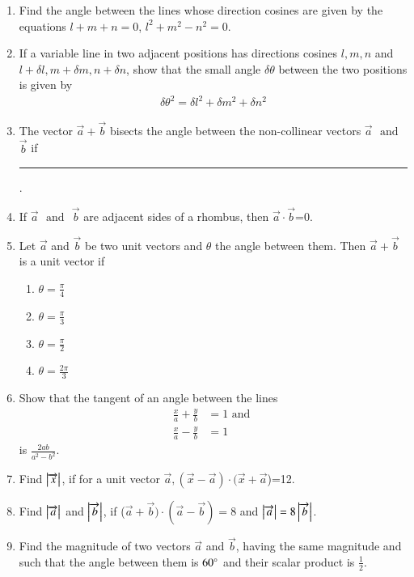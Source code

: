 \begin{enumerate}[label=\thesubsection.\arabic*,ref=\thesubsection.\theenumi]
\item Find the angle between the lines whose direction cosines are given by the equations $l+m+n=0$, $l^2+m^2-n^2=0$.
\item If a variable line in two adjacent positions has directions cosines $l, m, n$ and $l+\delta l, m+\delta m, n+\delta n$, show that the small angle $\delta\theta$ between the two positions is given by 
\begin{align}
	\delta\theta^2=\delta l^2+\delta m^2+\delta n^2
\end{align}
\item The vector $\vec{a}+\vec{b}$ bisects the angle between the non-collinear vectors $\vec{a}$ $\text{ and }$ $\vec{b}$ if \rule{1cm}{0.15mm}.
\item If $\vec{a}$ $\text{ and }$ $\vec{b}$ are adjacent sides of a rhombus, then $\vec{a}\cdot \vec{b}$=0.
\item Let $\vec{a}$ and $\vec{b}$ be two unit vectors and $\theta$ the angle between them. Then $\vec{a}+\vec{b}$ is a unit vector if
	\begin{enumerate}
			\itemsep2pt
		\item $\theta = \frac{\pi}{4}$
		\item $\theta = \frac{\pi}{3}$
		\item $\theta = \frac{\pi}{2}$
		\item $\theta = \frac{2\pi}{3}$
			\end{enumerate}
\solution

\item Show that the tangent of an angle between the lines 
\begin{align}
	\frac{x}{a}+\frac{y}{b}&=1 \text{ and }
	\\
	\frac{x}{a}-\frac{y}{b}&=1 
\end{align}
is $\frac{2ab}{a^2-b^2}$.
\item Find $\left\vert\overrightarrow {x}\right\vert$, if for a unit vector $\overrightarrow {a}, (\overrightarrow {x}-\overrightarrow {a})\cdot (\overrightarrow {x}+\overrightarrow {a}$)=12.
	\\
\solution 
		
\item Find $\left\vert\overrightarrow {a}\right\vert$ and $\left\vert\overrightarrow {b}\right\vert$, if ($\overrightarrow {a}+\overrightarrow {b})\cdot (\overrightarrow {a}-\overrightarrow {b})=8$ and $\left\vert\overrightarrow {a}\right\vert=8\left\vert\overrightarrow {b}\right\vert$.
	\\
	\solution
		
\item Find the magnitude of two vectors $\overrightarrow {a}$ and $\overrightarrow {b}$, having the same magnitude and such that the angle between them is $60\degree$ and their scalar product is $\frac{1}{2}$.

\end{enumerate}
